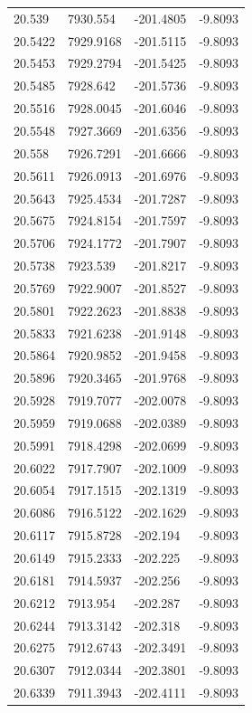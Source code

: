 \begin{table}[H]
\begin{tabular}{llll}
20.539 & 7930.554 & -201.4805 & -9.8093 \\
20.5422 & 7929.9168 & -201.5115 & -9.8093 \\
20.5453 & 7929.2794 & -201.5425 & -9.8093 \\
20.5485 & 7928.642 & -201.5736 & -9.8093 \\
20.5516 & 7928.0045 & -201.6046 & -9.8093 \\
20.5548 & 7927.3669 & -201.6356 & -9.8093 \\
20.558 & 7926.7291 & -201.6666 & -9.8093 \\
20.5611 & 7926.0913 & -201.6976 & -9.8093 \\
20.5643 & 7925.4534 & -201.7287 & -9.8093 \\
20.5675 & 7924.8154 & -201.7597 & -9.8093 \\
20.5706 & 7924.1772 & -201.7907 & -9.8093 \\
20.5738 & 7923.539 & -201.8217 & -9.8093 \\
20.5769 & 7922.9007 & -201.8527 & -9.8093 \\
20.5801 & 7922.2623 & -201.8838 & -9.8093 \\
20.5833 & 7921.6238 & -201.9148 & -9.8093 \\
20.5864 & 7920.9852 & -201.9458 & -9.8093 \\
20.5896 & 7920.3465 & -201.9768 & -9.8093 \\
20.5928 & 7919.7077 & -202.0078 & -9.8093 \\
20.5959 & 7919.0688 & -202.0389 & -9.8093 \\
20.5991 & 7918.4298 & -202.0699 & -9.8093 \\
20.6022 & 7917.7907 & -202.1009 & -9.8093 \\
20.6054 & 7917.1515 & -202.1319 & -9.8093 \\
20.6086 & 7916.5122 & -202.1629 & -9.8093 \\
20.6117 & 7915.8728 & -202.194 & -9.8093 \\
20.6149 & 7915.2333 & -202.225 & -9.8093 \\
20.6181 & 7914.5937 & -202.256 & -9.8093 \\
20.6212 & 7913.954 & -202.287 & -9.8093 \\
20.6244 & 7913.3142 & -202.318 & -9.8093 \\
20.6275 & 7912.6743 & -202.3491 & -9.8093 \\
20.6307 & 7912.0344 & -202.3801 & -9.8093 \\
20.6339 & 7911.3943 & -202.4111 & -9.8093 \\

\end{tabular}
\end{table}
